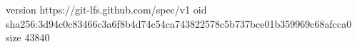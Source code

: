 version https://git-lfs.github.com/spec/v1
oid sha256:3d94c0c83466c3a6f8b4d74c54ca743822578c5b737bce01b359969c68afcca0
size 43840
